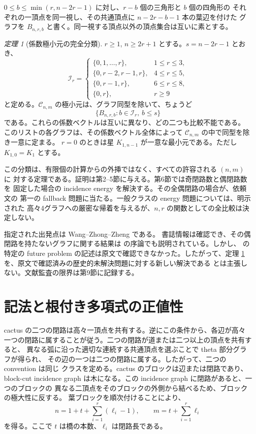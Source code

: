 \documentclass[12pt]{amsart}
\theoremstyle{definition}
\theoremstyle{remark}
\numberwithin{equation}{section}
\newtheorem{jthm}[thm]{定理}
\begin{document}
$0\le b\le\min(r,n-2r-1)$ に対し、$r-b$ 個の三角形と $b$ 個の四角形の
それぞれの一頂点を同一視し、その共通頂点に $n-2r-b-1$ 本の葉辺を付けた
グラフを $B_{n,r,b}$ と書く。同一視する頂点以外の頂点集合は互いに素とする。

\begin{jthm}[係数極小元の完全分類]\label{ja:frontier}
$r\ge1$, $n\ge2r+1$ とする。$s=n-2r-1$ とおき、
\[
 \mathcal I_r=
 \begin{cases}
 \{0,1,\ldots,r\},&1\le r\le3,\\
 \{0,r-2,r-1,r\},&4\le r\le5,\\
 \{0,r-1,r\},&6\le r\le8,\\
 \{0,r\},&r\ge9
 \end{cases}
\]
と定める。$\mathcal C_{n,m}$ の極小元は、グラフ同型を除いて、ちょうど
\[
 \bigl\{B_{n,r,b}:b\in\mathcal I_r,\ b\le s\bigr\}
\]
である。これらの係数ベクトルは互いに異なり、どの二つも比較不能である。
このリストの各グラフは、その係数ベクトル全体によって
$\mathcal C_{n,m}$ の中で同型を除き一意に定まる。
$r=0$ のときは星 $K_{1,n-1}$ が一意な最小元である。ただし $K_{1,0}=K_1$ とする。
\end{jthm}

この分類は、有限個の計算からの外挿ではなく、すべての許容される $(n,m)$ に
対する定理である。証明は第2--5節に与える。第6節では奇閉路数と偶閉路数を
固定した場合の incidence energy を解決する。その全偶閉路の場合が、依頼文の
第一の fallback 問題に当たる。一般クラスの energy 問題については、明示された
高々4グラフへの厳密な帰着を与えるが、$n,r$ の関数としての全比較は決定しない。

指定された出発点は Wang--Zhong--Zheng \cite{ja-wzz} である。
書誌情報は確認でき、その偶閉路を持たないグラフに関する結果は
\cite[p.~4216]{ja-zw} の序論でも説明されている。しかし、\cite{ja-wzz} の
特定の future problem の記述は原文で確認できなかった。したがって、定理
\ref{ja:frontier} を、原文で確認済みの歴史的未解決問題に対する新しい解決である
とは主張しない。文献監査の限界は第9節に記録する。

\section{記法と根付き多項式の正値性}
cactus の二つの閉路は高々一頂点を共有する。逆にこの条件から、各辺が高々
一つの閉路に属することが従う。二つの閉路が道または二つ以上の頂点を共有すると、
異なる弧に沿った適切な連続する共通頂点を選ぶことで theta 部分グラフが得られ、
その辺の一つは二つの閉路に属する。したがって、二つの convention は同じ
クラスを定める。cactus のブロックは辺または閉路であり、block-cut incidence
graph は木になる。この incidence graph に閉路があると、一つのブロックの
異なる二頂点をそのブロックの外側から結べるため、ブロックの極大性に反する。
葉ブロックを順次付けることにより、
\begin{equation}\label{ja:count}
 n=1+t+\sum_{i=1}^r(\ell_i-1),\qquad
 m=t+\sum_{i=1}^r\ell_i
\end{equation}
を得る。ここで $t$ は橋の本数、$\ell_i$ は閉路長である。
\end{document}
